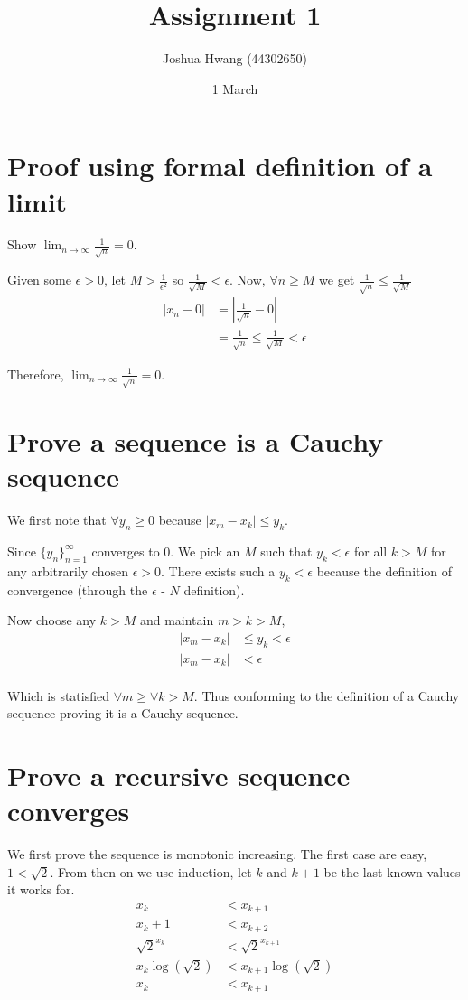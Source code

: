 \documentclass{article}
\title{Assignment 1}
\author{Joshua Hwang (44302650)}
\date{1 March}
\begin{document}
\maketitle

\section{Proof using formal definition of a limit}
Show $\lim_{n \to \infty} \frac{1}{\sqrt{n}} = 0$.

Given some $\epsilon > 0$, let $M > \frac{1}{\epsilon^2}$
so $\frac{1}{\sqrt{M}} < \epsilon$.
Now, $\forall n \geq M$
we get $\frac{1}{\sqrt{n}} \leq \frac{1}{\sqrt{M}}$
\begin{align*}
    \left|x_n - 0\right| &= \left|\frac{1}{\sqrt{n}} - 0\right| \\
    &= \frac{1}{\sqrt{n}} \leq \frac{1}{\sqrt{M}} < \epsilon
\end{align*}

Therefore, $\lim_{n \to \infty} \frac{1}{\sqrt{n}} = 0$.

\section{Prove a sequence is a Cauchy sequence}
We first note that $\forall y_n \geq 0$ because $|x_m - x_k| \leq y_k$.

Since $\{y_n\}^\infty_{n=1}$ converges to $0$. We pick an $M$ such that
$y_k < \epsilon$ for all $k > M$ for any arbitrarily chosen $\epsilon > 0$.
There exists such a $y_k < \epsilon$ because the definition of convergence
(through the $\epsilon$ - $N$ definition).

Now choose any $k > M$ and maintain $m > k > M$,
\begin{align*}
    |x_m - x_k| &\leq y_k < \epsilon \\
    |x_m - x_k| &< \epsilon \\
\end{align*}

Which is statisfied $\forall m \geq \forall k > M$.
Thus conforming to the definition of a Cauchy sequence proving it is a
Cauchy sequence.

\section{Prove a recursive sequence converges}
We first prove the sequence is monotonic increasing. The first case are
easy, $1 < \sqrt{2}$. From then on we use induction, let $k$ and $k+1$
be the last known values it works for.
\begin{align*}
    x_k &< x_{k+1} \\
    x_k+1 &< x_{k+2} \\
    \sqrt{2}^{x_k} &< \sqrt{2}^{x_{k+1}} \\
    x_k \log\left(\sqrt{2}\right) &< x_{k+1} \log\left(\sqrt{2}\right) \\
    x_k &< x_{k+1}
\end{align*}
\end{document}
